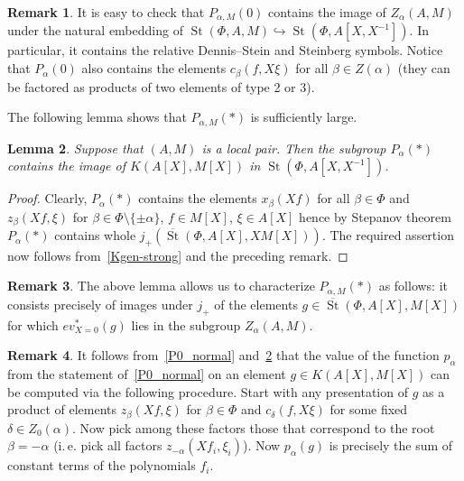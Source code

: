 \documentclass[oneside, 8pt]{amsart}
\newtheorem{lemma}{Lemma}
\theoremstyle{remark}
\theoremstyle{definition}
\numberwithin{lemma}{section}
\numberwithin{prop}{section}
\numberwithin{corollary}{section}
\newtheorem{rem}[lemma]{Remark}
\DeclareMathOperator{\St}{St}
\newcommand{\inv}{^{-1}}
\numberwithin{equation}{section}
\begin{document}
\begin{rem}\label{rem:c-DS} It is easy to check that $P_{\alpha, M}(0)$ contains the image of $Z_\alpha(A, M)$ under the natural embedding of $\St(\Phi, A, M) \hookrightarrow \St(\Phi, A[X, X\inv])$.
In particular, it contains the relative Dennis--Stein and Steinberg symbols.
Notice that $P_\alpha(0)$ also contains the elements $c_{\beta}(f, X\xi)$ for all $\beta \in Z(\alpha)$ (they can be factored as products of two elements of type 2 or 3). \end{rem}

The following lemma shows that $P_{\alpha, M}(*)$ is sufficiently large.
\begin{lemma} \label{Pstar-large} Suppose that $(A, M)$ is a local pair. Then the subgroup $P_\alpha(*)$ contains the image of $K(A[X], M[X])$ in $\St(\Phi, A[X, X^{-1}])$. \end{lemma}
\begin{proof} Clearly, $P_\alpha(*)$ contains the elements $x_\beta(Xf)$ for all $\beta \in \Phi$ and $z_\beta(Xf, \xi)$ for $\beta \in \Phi \setminus \{\pm \alpha\}$, $f \in M[X]$, $\xi\in A[X]$ hence by Stepanov theorem $P_\alpha(*)$ contains whole $j_+(\overline{\St}(\Phi, A[X], XM[X]))$. The required assertion now follows from~\cref{Kgen-strong} and the preceding remark. \end{proof}

\begin{rem} \label{Pstar-char} The above lemma allows us to characterize $P_{\alpha, M}(*)$ as follows: it consists precisely of images under $j_+$ of the elements 
 $g \in \overline{\St}(\Phi, A[X], M[X])$ for which $ev_{X=0}^*(g)$ lies in the subgroup $Z_\alpha(A, M)$. \end{rem} 

\begin{rem} \label{rem:palpha} It follows from~\cref{P0_normal} and~\cref{Pstar-large} that the value of the function $p_\alpha$ from the statement of~\cref{P0_normal} on an element $g\in K(A[X], M[X])$ can be computed via the following procedure. 
Start with any presentation of $g$ as a product of elements $z_{\beta}(Xf, \xi)$ for $\beta \in \Phi$ and $c_\delta(f, X\xi)$ for some fixed $\delta\in Z_0(\alpha)$. 
Now pick among these factors those that correspond to the root $\beta = -\alpha$ (i.\,e. pick all factors $z_{-\alpha}(Xf_i, \xi_i)$). 
Now $p_\alpha(g)$ is precisely the sum of constant terms of the polynomials $f_i$. \end{rem}
\end{document}
